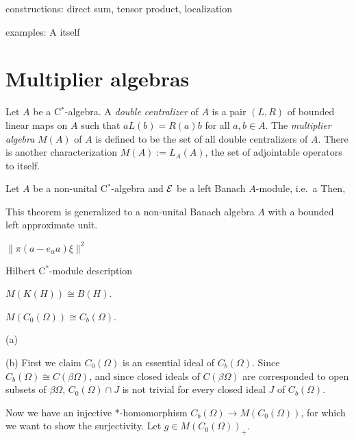 \documentclass{../../large}
\begin{document}
constructions:
direct sum, tensor product, localization

examples:
A itself


\section{Multiplier algebras}
\begin{prb}
Let $A$ be a C$^*$-algebra.
A \emph{double centralizer} of $A$ is a pair $(L,R)$ of bounded linear maps on $A$ such that $aL(b)=R(a)b$ for all $a,b\in A$.
The \emph{multiplier algebra} $M(A)$ of $A$ is defined to be the set of all double centralizers of $A$.
There is another characterization $M(A):=L_A(A)$, the set of adjointable operators to itself.
\end{prb}

\begin{prb}
Let $A$ be a non-unital C$^*$-algebra and $\mathcal{E}$ be a left Banach $A$-module, i.e.~a 
Then, 

This theorem is generalized to a non-unital Banach algebra $A$ with a bounded left approximate unit.
\end{prb}

\begin{prb}
\begin{parts}
\item $\|\pi(a-e_\alpha a)\xi\|^2$
\end{parts}
\end{prb}

\begin{prb}
\begin{parts}
\item Hilbert C$^*$-module description
\end{parts}
\end{prb}


\begin{prb}
\begin{parts}
\item $M(K(H))\cong B(H)$.
\item $M(C_0(\Omega))\cong C_b(\Omega)$.
\end{parts}
\end{prb}
\begin{pf}
(a)

(b)
First we claim $C_0(\Omega)$ is an essential ideal of $C_b(\Omega)$.
Since $C_b(\Omega)\cong C(\beta\Omega)$, and since closed ideals of $C(\beta\Omega)$ are corresponded to open subsets of $\beta\Omega$, $C_0(\Omega)\cap J$ is not trivial for every closed ideal $J$ of $C_b(\Omega)$.

Now we have an injective $*$-homomorphism $C_b(\Omega)\to M(C_0(\Omega))$, for which we want to show the surjectivity.
Let $g\in M(C_0(\Omega))_+$.
\end{pf}
\end{document}
